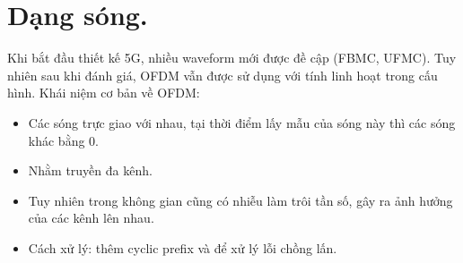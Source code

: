 \section{Dạng sóng.}
Khi bắt đầu thiết kế 5G, nhiều waveform mới được đề cập (FBMC, UFMC). Tuy nhiên sau khi đánh giá, OFDM vẫn được sử dụng với tính linh hoạt trong cấu hình. \cite{ShareTechnote_5G_Waveform}
Khái niệm cơ bản về OFDM: 
\begin{itemize}
    \item Các sóng trực giao với nhau, tại thời điểm lấy mẫu của sóng này thì các sóng khác bằng 0.
    \item Nhằm truyền đa kênh.
    \item Tuy nhiên trong không gian cũng có nhiễu làm trôi tần số, gây ra ảnh hưởng của các kênh lên nhau.
    \item Cách xử lý: thêm cyclic prefix và để xử lý lỗi chồng lấn.
\end{itemize}
